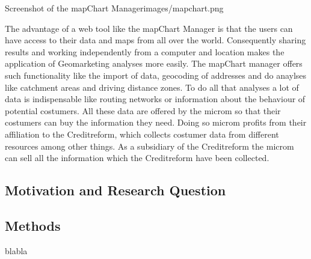 \begin{figureOwn}{Screenshot of the mapChart Manager}{images/mapchart.png}\end{figureOwn}

The advantage of a web tool like the mapChart Manager is that the users can have access to their data and maps from all over the world. Consequently sharing results and working independently from a computer and location makes the application of Geomarketing analyses more easily. The mapChart manager offers such functionality like the import of data, geocoding of addresses and do anaylses like catchment areas and driving distance zones. To do all that analyses a lot of data is indispensable  like routing networks or information about the behaviour of potential costumers. All these data are offered by the microm so that their costumers can buy the information they need. Doing so microm profits from their affiliation to the Creditreform, which collects costumer data from different resources among other things. As a subsidiary of the Creditreform the microm can sell all the information which the Creditreform have been collected.

\subsection{Motivation and Research Question}


\subsection{Methods}
blabla

